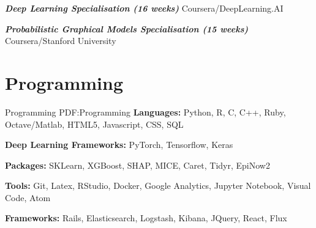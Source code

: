 \documentclass[letterpaper,10pt,oneside]{article}
\begin{document}
\begin{body}
\textbf{\textit{Deep Learning Specialisation (16 weeks)}} Coursera/DeepLearning.AI 
\hfill
{}

\textbf{\textit{Probabilistic Graphical Models Specialisation (15 weeks)}} Coursera/Stanford University 
\hfill
{}


\section
{Programming}
{Programming}
{PDF:Programming}
\textbf{Languages:} Python, R, C, C++, Ruby, Octave/Matlab, HTML5, Javascript, CSS, SQL

\textbf{Deep Learning Frameworks:}  PyTorch, Tensorflow, Keras

\textbf{Packages:} SKLearn, XGBoost, SHAP, MICE, Caret, Tidyr, EpiNow2

\textbf{Tools:} Git, Latex, RStudio, Docker, Google Analytics, Jupyter Notebook, Visual Code, Atom

\textbf{Frameworks:} Rails, Elasticsearch, Logstash, Kibana, JQuery, React, Flux
\end{body}


\label{LastPage}~
\end{document}
